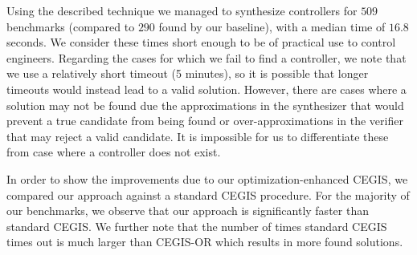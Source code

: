\documentclass[sigconf]{llncs}
\begin{document}
Using the described technique we managed to synthesize controllers for $509$
benchmarks (compared to $290$ found by our baseline), with a median time of
$16.8$ seconds.
%
We consider these times short enough to be of practical use to control
engineers.  Regarding the cases for which we fail to find a controller, we
note that we use a relatively short timeout (5 minutes), so it is possible
that longer timeouts would instead lead to a valid solution.  However, there
are cases where a solution may not be found due the approximations in the
synthesizer that would prevent a true candidate from being found or
over-approximations in the verifier that may reject a valid candidate.  It
is impossible for us to differentiate these from case where a controller
does not exist.

In order to show the improvements due to our optimization-enhanced CEGIS, we
compared our approach against a standard CEGIS procedure.  For the majority
of our benchmarks, we observe that our approach is significantly faster than
standard CEGIS.  We further note that the number of times standard CEGIS
times out is much larger than CEGIS-OR which results in more found
solutions.

\end{document}

